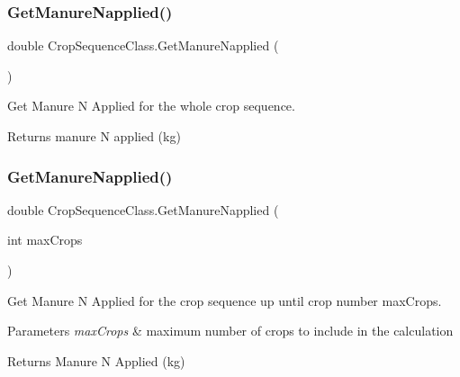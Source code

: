 \subsubsection{\texorpdfstring{GetManureNapplied()}{GetManureNapplied()}\hspace{0.1cm}{\footnotesize\ttfamily [1/2]}}
{\footnotesize\ttfamily double Crop\+Sequence\+Class.\+Get\+Manure\+Napplied (\begin{DoxyParamCaption}{ }\end{DoxyParamCaption})\hspace{0.3cm}{\ttfamily [inline]}}



Get Manure N Applied for the whole crop sequence. 

\begin{DoxyReturn}{Returns}
manure N applied (kg) 
\end{DoxyReturn}
\mbox{\label{class_crop_sequence_class_ab8a9ab2dcf60987421ec6d1dcc69be30}} 
\subsubsection{\texorpdfstring{GetManureNapplied()}{GetManureNapplied()}\hspace{0.1cm}{\footnotesize\ttfamily [2/2]}}
{\footnotesize\ttfamily double Crop\+Sequence\+Class.\+Get\+Manure\+Napplied (\begin{DoxyParamCaption}\item[{int}]{max\+Crops }\end{DoxyParamCaption})\hspace{0.3cm}{\ttfamily [inline]}}



Get Manure N Applied for the crop sequence up until crop number max\+Crops. 


\begin{DoxyParams}{Parameters}
{\em max\+Crops} & maximum number of crops to include in the calculation \\
\hline
\end{DoxyParams}
\begin{DoxyReturn}{Returns}
Manure N Applied (kg) 
\end{DoxyReturn}
\mbox{\label{class_crop_sequence_class_a7f13a7bbf89986c17605e4df01576abf}} 
